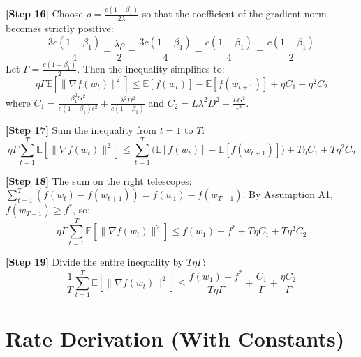 \documentclass[11pt]{article}
\begin{document}
\textbf{[Step 16]} Choose $\rho = \frac{c(1-\beta_1)}{2\lambda}$ so that the coefficient of the gradient norm becomes strictly positive:
\begin{equation}
    \frac{3c(1-\beta_1)}{4} - \frac{\lambda \rho}{2} = \frac{3c(1-\beta_1)}{4} - \frac{c(1-\beta_1)}{4} = \frac{c(1-\beta_1)}{2}
\end{equation}
Let $\Gamma = \frac{c(1-\beta_1)}{2}$. Then the inequality simplifies to:
\begin{equation}
    \eta \Gamma \mathbb{E}[\|\nabla f(w_t)\|^2] \leq \mathbb{E}[f(w_t)] - \mathbb{E}[f(w_{t+1})] + \eta C_1 + \eta^2 C_2
\end{equation}
where $C_1 = \frac{\beta_1^2 G^2}{c(1-\beta_1)\epsilon^2} + \frac{\lambda^2 D^2}{c(1-\beta_1)}$ and $C_2 = L \lambda^2 D^2 + \frac{L G^2}{\epsilon^2}$.

\textbf{[Step 17]} Sum the inequality from $t=1$ to $T$:
\begin{equation}
    \eta \Gamma \sum_{t=1}^T \mathbb{E}[\|\nabla f(w_t)\|^2] \leq \sum_{t=1}^T \Big( \mathbb{E}[f(w_t)] - \mathbb{E}[f(w_{t+1})] \Big) + T \eta C_1 + T \eta^2 C_2
\end{equation}

\textbf{[Step 18]} The sum on the right telescopes: $\sum_{t=1}^T (f(w_t) - f(w_{t+1})) = f(w_1) - f(w_{T+1})$. By Assumption A1, $f(w_{T+1}) \geq f^*$, so:
\begin{equation}
    \eta \Gamma \sum_{t=1}^T \mathbb{E}[\|\nabla f(w_t)\|^2] \leq f(w_1) - f^* + T \eta C_1 + T \eta^2 C_2
\end{equation}

\textbf{[Step 19]} Divide the entire inequality by $T \eta \Gamma$:
\begin{equation}
    \frac{1}{T} \sum_{t=1}^T \mathbb{E}[\|\nabla f(w_t)\|^2] \leq \frac{f(w_1) - f^*}{T \eta \Gamma} + \frac{C_1}{\Gamma} + \frac{\eta C_2}{\Gamma}
\end{equation}

\section*{Rate Derivation (With Constants)}
\end{document}
